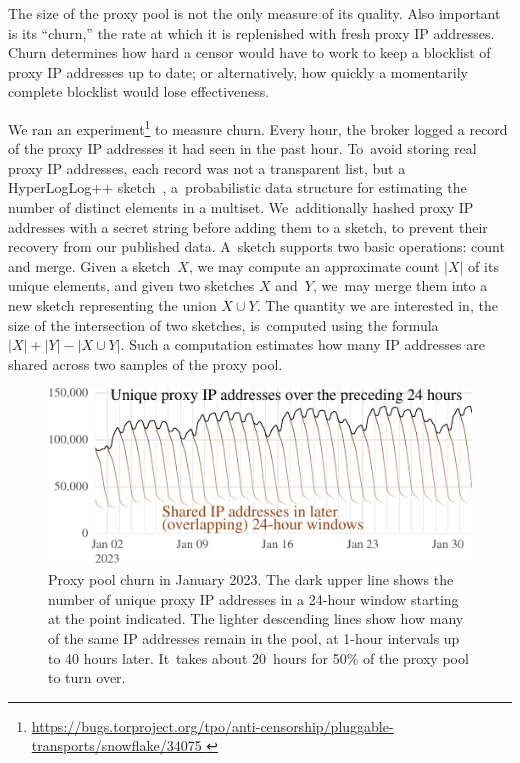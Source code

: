 \documentclass[letterpaper,twocolumn]{article}
\newlength{\urlfootnotesize}
\newcommand{\urlfootnote}[1]{\footnote{
\raggedright\fontsize{\urlfootnotesize}{\urlfootnotesize}\selectfont\url{#1}
}}
\begin{document}
The size of the proxy pool is not the only measure of its quality.
Also important is its ``churn,'' the rate at which
it is replenished with fresh proxy IP addresses.
Churn determines how hard a censor would have to work
to keep a blocklist of proxy IP addresses up to date;
or alternatively,
how quickly a momentarily complete blocklist
would lose effectiveness.

We ran an experiment\urlfootnote{
https://bugs.torproject.org/tpo/anti-censorship/pluggable-transports/snowflake/34075
}
to measure churn.
Every hour, the broker logged a record of
the proxy IP addresses it had seen in the past hour.
To~avoid storing real proxy IP addresses,
each record was not a transparent list,
but a HyperLogLog++ sketch~\cite{Heule2013a},
a~probabilistic data structure for estimating
the number of distinct elements in a multiset.
We~additionally hashed proxy IP addresses with a secret string
before adding them to a sketch,
to prevent their recovery from our published data.
A~sketch supports two basic operations: count and merge.
Given a sketch~\(X\),
we may compute an approximate count \(|X|\)
of its unique elements,
and given two sketches \(X\) and~\(Y\),
we~may merge them into a new sketch
representing the union \(X \cup Y\).
The quantity we are interested in,
the size of the intersection of two sketches,
is~computed using the formula
\(|X| + |Y| - |X \cup Y|\).
Such a computation estimates
how many IP addresses are shared across
two samples of the proxy pool.

\begin{figure}
\includegraphics{figures/proxy-churn/proxy-count-decay}
\caption{
Proxy pool churn in January 2023.
The dark upper line shows the number
of unique proxy IP addresses in a 24-hour window
starting at the point indicated.
The lighter descending lines show
how many of the same IP addresses remain in the pool,
at 1-hour intervals up to 40 hours later.
It~takes about 20~hours for 50\% of the proxy pool to turn over.
}
\label{fig:proxy-count-decay}
\end{figure}
\end{document}
